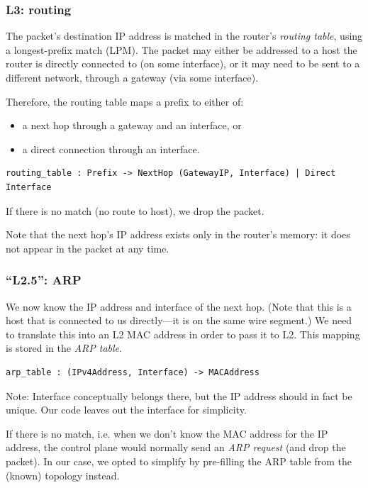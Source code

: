 \documentclass[11pt,oneside,a4paper]{article}
\begin{document}
\subsubsection{L3: routing}
The packet's destination IP address is matched in the router's \emph{routing
table}, using a longest-prefix match (LPM).
The packet may either be addressed to a host the router is directly connected to
(on some interface), or it may need to be sent to a different network, through a
gateway (via some interface).

Therefore, the routing table maps a prefix to either of:
\begin{itemize}
\item a next hop through a gateway and an interface, or
\item a direct connection through an interface.
\end{itemize}

\begin{verbatim}
routing_table : Prefix -> NextHop (GatewayIP, Interface) | Direct Interface
\end{verbatim}

If there is no match (no route to host), we drop the packet.

Note that the next hop's IP address exists only in the router's memory: it does
not appear in the packet at any time.

\subsubsection{``L2.5'': ARP}
We now know the IP address and interface of the next hop.
(Note that this is a host that is connected to us directly---it is on the same
wire segment.)
We need to translate this into an L2 MAC address in order to pass it to L2.
This mapping is stored in the \emph{ARP table}.

\begin{verbatim}
arp_table : (IPv4Address, Interface) -> MACAddress
\end{verbatim}

Note: Interface conceptually belongs there, but the IP address should in fact be
unique.
Our code leaves out the interface for simplicity.

If there is no match, i.e. when we don’t know the MAC address for the IP
address, the control plane would normally send an \emph{ARP request} (and drop
the packet).
In our case, we opted to simplify by pre-filling the ARP table from the (known)
topology instead.
\end{document}
